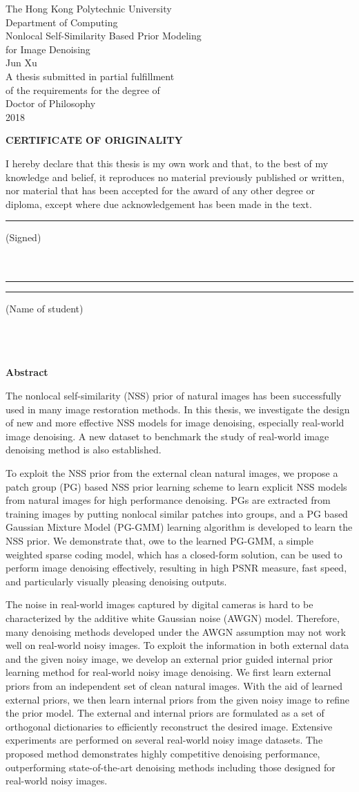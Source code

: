 \documentclass[12pt,oneside]{report}
\makeatletter
\numberwithin{figure}{chapter}
\newenvironment{preliminary}%
{\pagestyle{plain}\pagenumbering{roman}}%
{\pagenumbering{arabic}}
\newcommand\isdefinedsig[1]{%
  \edef\@tempa{#1}%
  \def\@tempb{}%
  \ifx\@tempa\@tempb
	\else\rule[-4.5pt]{5.5cm}{0.5pt}\signname\\ \\{#1}\\
  \fi
}
\newcommand\isdefinedsigname[1]{%
  \edef\@tempa{#1}%
  \def\@tempb{}%
  \ifx\@tempa\@tempb
	\else\rule[-5pt]{0.05cm}{0.5pt}\underline{}\rule[-5pt]{4cm}{0.5pt}\stuname\\ \\{#1}\\%
  \fi
}
\newcommand\isdefinedspinetitle[1]{%
  \edef\@tempa{#1}%
  \def\@tempb{}%
  \ifx\@tempa\@tempb
	\else (Spine title: #1)\\
  \fi
}
\newcommand{\signname}{(Signed)}
\newcommand{\stuname}{(Name of student)}
\newcommand{\department}{Computing}
\newcommand{\degree}{Doctor of Philosophy}
\newcommand{\firstname}{Jun}
\newcommand{\middlename}{}
\newcommand{\lastname}{Xu}
\newcommand{\authorname}{{\firstname} {\middlename} {\lastname}}
\newcommand{\titl}{Real-time and Robust Visual Tracking}
\newcommand{\thesisformat}{Monograph} %
\newcommand{\gyear}{\number\year}
\renewcommand{\maketitle}
{\begin{titlepage}
   \setcounter{page}{1}
   \begin{large}
   \begin{center}
      \mbox{}
      \vfill
	{\LARGE The Hong Kong Polytechnic University} \\
    {\Large Department of Computing}\\
      \vfill
      {\LARGE Nonlocal Self-Similarity Based Prior Modeling \\for Image Denoising} \\
      \vfill
       {\firstname}  {\lastname}\\

      \vfill
		A thesis submitted in partial fulfillment\\
		of the requirements for the degree of\\
		\degree\\
		\vfill
		\vfill
     2018\\
      \vspace*{.2in}


   \end{center}
   \end{large}
   \end{titlepage}

}%
\newcommand{\makecert}{
   \setcounter{page}{2}
\vfill
\begin{center}
\large
\textbf{CERTIFICATE OF ORIGINALITY}\\
\vfill
\end{center}

\vfill
I hereby declare that this thesis is my own work and that, to the best of my knowledge and belief, it reproduces no material previously published or written, nor material that has been accepted for the award of any other degree or diploma, except where due acknowledgement has been made in the text. \\
\vfill
\vfill
\vfill
\hspace{2.5in}\isdefinedsig{ }
\vfill
\hspace{2.5in}\isdefinedsigname{ }\\
\vfill
\vfill
\vfill
\vfill
}
\makeatother
\begin{document}


\begin{preliminary}

\maketitle
{}
\makecert
\newpage


\Large\begin{center}\textbf{Abstract}\end{center}\normalsize


The nonlocal self-similarity (NSS) prior of natural images has been successfully used in many image restoration methods. In this thesis, we investigate the design of new and more effective NSS models for image denoising, especially real-world image denoising. A new dataset to benchmark the study of real-world image denoising method is also established.

To exploit the NSS prior from the external clean natural images, we propose a patch group (PG) based NSS prior learning scheme to learn explicit NSS models from natural images for high performance denoising. PGs are extracted from training images by putting nonlocal similar patches into groups, and a PG based Gaussian Mixture Model (PG-GMM) learning algorithm is developed to learn the NSS prior. We demonstrate that, owe to the learned PG-GMM, a simple weighted sparse coding model, which has a closed-form solution, can be used to perform image denoising effectively, resulting in high PSNR measure, fast speed, and particularly visually pleasing denoising outputs.

The noise in real-world images captured by digital cameras is hard to be characterized by the additive white Gaussian noise (AWGN) model. Therefore, many denoising methods developed under the AWGN assumption may not work well on real-world noisy images. To exploit the information in both external data and the given noisy image, we develop an external prior guided internal prior learning method for real-world noisy image denoising. We first learn external priors from an independent set of clean natural images. With the aid of learned external priors, we then learn internal priors from the given noisy image to refine the prior model. The external and internal priors are formulated as a set of orthogonal dictionaries to efficiently reconstruct the desired image. Extensive experiments are performed on several real-world noisy image datasets. The proposed method demonstrates highly competitive denoising performance, outperforming state-of-the-art denoising methods including those designed for real-world noisy images.


\end{preliminary}
\end{document}
